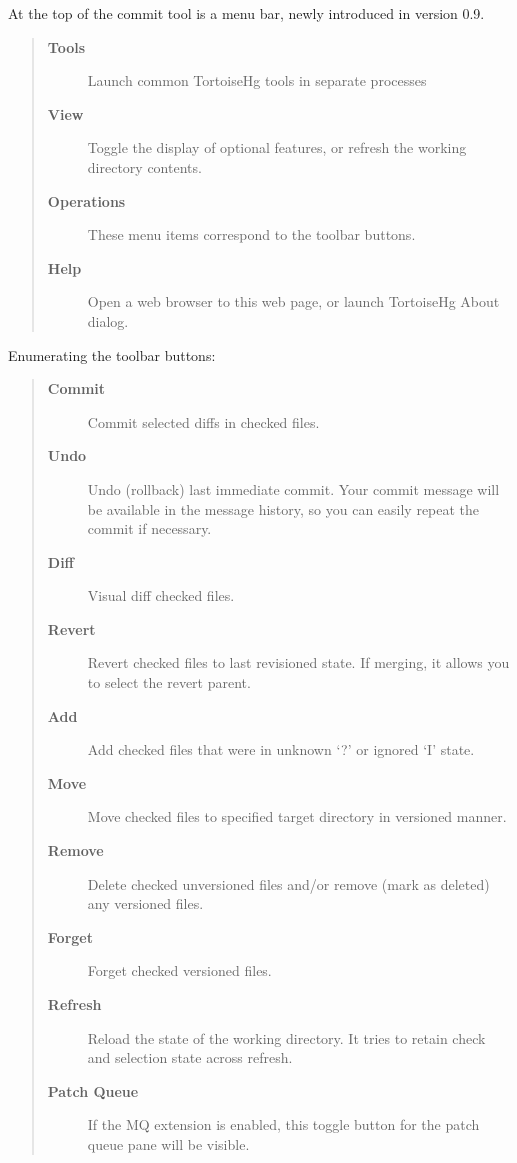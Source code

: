 \documentclass[letterpaper,10pt,english]{manual}
\begin{document}
At the top of the commit tool is a menu bar, newly introduced in version 0.9.
\begin{quote}
\begin{description}
\item[\textbf{Tools}]
Launch common TortoiseHg tools in separate processes

\item[\textbf{View}]
Toggle the display of optional features, or refresh the working
directory contents.

\item[\textbf{Operations}]
These menu items correspond to the toolbar buttons.

\item[\textbf{Help}]
Open a web browser to this web page, or launch TortoiseHg About
dialog.

\end{description}
\end{quote}

Enumerating the toolbar buttons:
\begin{quote}
\begin{description}
\item[\textbf{Commit}]
Commit selected diffs in checked files.

\item[\textbf{Undo}]
Undo (rollback) last immediate commit. Your commit message will be
available in the message history, so you can easily repeat the
commit if necessary.

\item[\textbf{Diff}]
Visual diff checked files.

\item[\textbf{Revert}]
Revert checked files to last revisioned state.  If merging, it
allows you to select the revert parent.

\item[\textbf{Add}]
Add checked files that were in unknown `?' or ignored `I' state.

\item[\textbf{Move}]
Move checked files to specified target directory in versioned
manner.

\item[\textbf{Remove}]
Delete checked unversioned files and/or remove (mark as deleted) any
versioned files.

\item[\textbf{Forget}]
Forget checked versioned files.

\item[\textbf{Refresh}]
Reload the state of the working directory. It tries to retain
check and selection state across refresh.

\item[\textbf{Patch Queue}]
If the MQ extension is enabled, this toggle button for the patch
queue pane will be visible.

\end{description}
\end{quote}
\end{document}

